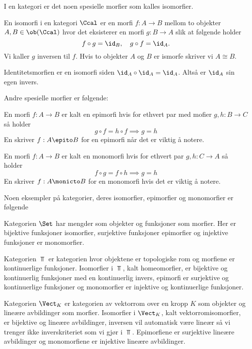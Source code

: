 I en kategori er det noen spesielle morfier som kalles isomorfier.
\begin{definition}\label{Def:Iso}
    En isomorfi i en kategori $\Ccal$ er en morfi $f:A\to B$ mellom to objekter $A,B\in\ob(\Ccal)$ hvor det eksisterer en morfi $g:B\to A$ slik at følgende holder
    \[f\circ g = \id_B,\quad g\circ f = \id_A.\]
    Vi kaller $g$ inversen til $f$. Hvis to objekter $A$ og $B$ er ismorfe skriver vi $A\cong B$.
\end{definition}

\begin{remark}\label{Rem:IdIso}
    Identitetsmorfien er en isomorfi siden $\id_A\circ\id_A = \id_A$. Altså er $\id_A$ sin egen invers.
\end{remark}

Andre spesielle morfier er følgende:
\begin{definition}\label{Def:Epi}
    En morfi $f: A\to B$ er kalt en epimorfi hvis for ethvert par med mofier $g,h: B\to C$ så holder
    \[g\circ f = h\circ f \implies g = h\]
    En skriver $f:A\epito B$ for en epimorfi når det er viktig å notere.
\end{definition}

\begin{definition}\label{Def:Mono}
    En morfi $f: A\to B$ er kalt en monomorfi hvis for ethvert par $g,h: C\to A$ så holder
    \[f\circ g = f\circ h \implies g=h\]
    En skriver $f: A\monicto B$ for en monomorfi hvis det er viktig å notere.
\end{definition}

Noen eksempler på kategorier, deres isomorfier, epimorfier og monomorfier er følgende
\begin{example}\label{Ex:Set}
    Kategorien $\Set$ har mengder som objekter og funksjoner som morfier. Her er bijektive funksjoner isomorfier, surjektive funksjoner epimorfier og injektive funksjoner er monomorfier.
\end{example}

\begin{example}\label{Ex:TopKat}
    Kategorien $\Top$ er kategorien hvor objektene er topologiske rom og morfiene er kontinuerlige funksjoner. Isomorfier i $\Top$, kalt homeomorfier, er bijektive og kontinuerlig funksjoner med en kontinuerlig invers, epimorfi er surjektive og kontinuerlige funksjoner og monomorfier er injektive og kontinuerlige funksjoner. 
\end{example}

\begin{example}\label{Ex:VektKat}
    Kategorien $\Vect_K$ er kategorien av vektorrom over en kropp $K$ som objekter og lineære avbildinger som morfier. Isomorfier i $\Vect_K$, kalt vektorromisomorfier, er bijektive og lineære avbildinger, inversen vil automatisk være lineær så vi trenger ikke inverskriteriet som vi gjør i $\Top$. Epimorfiene er surjektive lineære avbildinger og monomorfiene er injektive lineære avbildinger.
\end{example}

